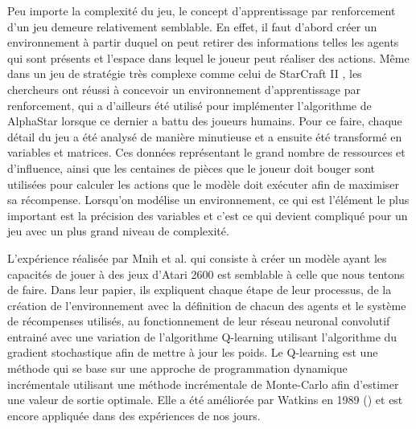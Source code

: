 \documentclass{article}
\begin{document}
Peu importe la complexité du jeu, le concept d'apprentissage par renforcement d'un jeu demeure relativement semblable. En effet, il faut d'abord créer un environnement à partir duquel on peut retirer des informations telles les agents qui sont présents et l'espace dans lequel le joueur peut réaliser des actions. Même dans un jeu de stratégie très complexe comme celui de StarCraft II \cite{DBLP:journals/corr/abs-1708-04782}, les chercheurs ont réussi à concevoir un environnement d'apprentissage par renforcement, qui a d'ailleurs été utilisé pour implémenter l'algorithme de AlphaStar lorsque ce dernier a battu des joueurs humains. Pour ce faire, chaque détail du jeu a été analysé de manière minutieuse et a ensuite été transformé en variables et matrices. Ces données représentant le grand nombre de ressources et d'influence, ainsi que les centaines de pièces que le joueur doit bouger sont utilisées pour calculer les actions que le modèle doit exécuter afin de maximiser sa récompense. Lorsqu'on modélise un environnement, ce qui est l'élément le plus important est la précision des variables et c'est ce qui devient compliqué pour un jeu avec un plus grand niveau de complexité.
\linebreak

L'expérience réalisée par Mnih et al. \cite{DBLP:journals/corr/MnihKSGAWR13} qui consiste à créer un modèle ayant les capacités de jouer à des jeux d'Atari 2600 est semblable à celle que nous tentons de faire. Dans leur papier, ils expliquent chaque étape de leur processus, de la création de l'environnement avec la définition de chacun des agents et le système de récompenses utilisés, au fonctionnement de leur réseau neuronal convolutif entrainé avec une variation de l'algorithme Q-learning utilisant l'algorithme du gradient stochastique afin de mettre à jour les poids. Le Q-learning est une méthode qui se base sur une approche de programmation dynamique incrémentale utilisant une méthode incrémentale de Monte-Carlo afin d'estimer une valeur de sortie optimale. Elle a été améliorée par Watkins en 1989 (\cite{article}) et est encore appliquée dans des expériences de nos jours. 
\end{document}
